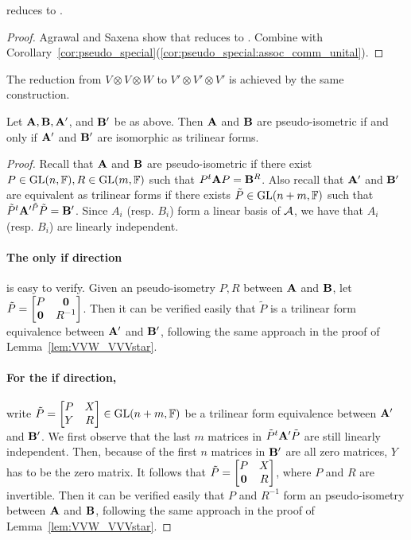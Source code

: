 \documentclass[11pt]{article}
\begin{document}
\begin{corollary} \label{cor:comm_cubic_form}
\ThreeTIlong reduces to \CubicFormlong. 
\end{corollary}

\begin{proof}
Agrawal and Saxena \cite{AS06} show that  reduces to \CubicFormlong. Combine with Corollary~\ref{cor:pseudo_special}(\ref{cor:pseudo_special:assoc_comm_unital}). 
\end{proof}


The reduction from $V\otimes V\otimes W$ to $V' \otimes V' \otimes V'$ is achieved by 
the same construction.
\begin{lemma}\label{lem:VVW_VVV}
Let $\mathbf{A}, \mathbf{B}, \mathbf{A}'$, and $\mathbf{B}'$ be as above. Then $\mathbf{A}$ and $\mathbf{B}$ 
are pseudo-isometric if and only if $\mathbf{A}'$ and $\mathbf{B}'$ are isomorphic as 
trilinear forms.
\end{lemma}
\begin{proof}
Recall that $\mathbf{A}$ and $\mathbf{B}$ are pseudo-isometric if there exist 
$P\in\mathrm{GL}(n, \mathbb{F}), R\in\mathrm{GL}(m, \mathbb{F})$ such that $P^t\mathbf{A} P=\mathbf{B}^R$. Also recall that 
$\mathbf{A}'$ and 
$\mathbf{B}'$ are equivalent as trilinear forms if there exists 
$\tilde P\in\mathrm{GL}(n+m, \mathbb{F})$ 
such that $\tilde P^t\mathbf{A}'^{\tilde P} \tilde P=\mathbf{B}'$. Since $A_i$ (resp. $B_i$) form a linear basis of 
$\mathcal{A}$, we have that $A_i$ (resp. 
$B_i$) are linearly independent.

\paragraph{The only if direction} is easy to verify. Given an pseudo-isometry $P, R$ between 
$\mathbf{A}$ and $\mathbf{B}$, let $\tilde P=\begin{bmatrix}
P & \mathbf{0} \\
\mathbf{0} & R^{-1}
\end{bmatrix}$. Then it can be verified easily that $\tilde P$ is a trilinear form equivalence between $\mathbf{A}'$ and $\mathbf{B}'$, following the same approach in 
the proof of  
Lemma~\ref{lem:VVW_VVVstar}.

\paragraph{For the if direction,} write $\tilde P=\begin{bmatrix}
P & X \\
Y & R
\end{bmatrix}\in\mathrm{GL}(n+m, \mathbb{F})$ be a trilinear form equivalence between 
$\mathbf{A}'$ and 
$\mathbf{B}'$. We first observe that the last $m$ matrices in $\tilde P^t\mathbf{A}' \tilde P$ are still 
linearly independent. Then, because of the first $n$ matrices in $\mathbf{B}'$ are all 
zero matrices, $Y$ has to be the zero matrix. It follows that 
$\tilde P=\begin{bmatrix}
P & X \\
\mathbf{0} & R
\end{bmatrix}$, where $P$ and $R$ are invertible. Then it can be 
verified easily that $P$ and $R^{-1}$ form an pseudo-isometry between $\mathbf{A}$ and 
$\mathbf{B}$, 
following the same approach in 
the proof of  
Lemma~\ref{lem:VVW_VVVstar}.
\end{proof}
\end{document}
